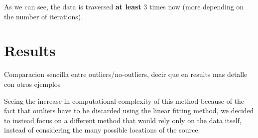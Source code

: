 As we can see, the data is traversed \textbf{at least} 3 times now (more depending on the number of iterations).

\section{Results}

Comparacion sencilla entre outliers/no-outliers, decir que en results mas detalle con otros ejemplos

Seeing the increase in computational complexity of this method because of the fact that outliers have to be discarded using the linear fitting method, we decided to instead focus on a different method that would rely only on the data itself, instead of considering the many possible locations of the source.